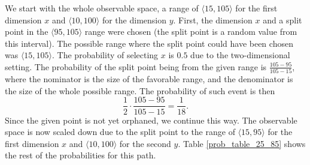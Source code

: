 We start with the whole observable space, a range of $\langle 15, 105\rangle$ for the first dimension $x$ and $\langle 10,100\rangle$ for the dimension $y$.
First, the dimension $x$ and a split point in the $\langle 95, 105\rangle$ range were chosen (the split point is a random value from this interval). The possible range where the split point could have been chosen was $\langle 15,105\rangle$.
The probability of selecting $x$ is $0.5$ due to the two-dimensional setting.
The probability of the split point being from the given range is $\frac{105-95}{105-15}$, where the nominator is the size of the favorable range, and the denominator is the size of the whole possible range.
The probability of such event is then $$\frac{1}{2}\cdot\frac{105-95}{105-15} = \frac{1}{18}.$$
Since the given point is not yet orphaned, we continue this way. The observable space is now scaled down due to the split point to the range of $\langle 15, 95\rangle$ for the first dimension $x$ and $\langle 10,100\rangle$ for the second $y$. Table \ref{prob_table_25_85} shows the rest of the probabilities for this path.


